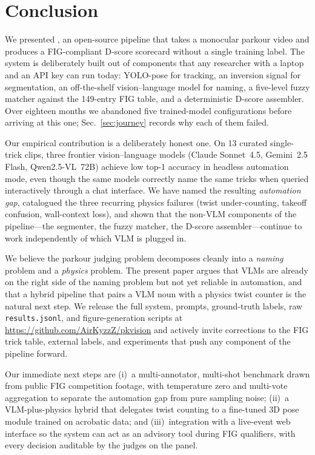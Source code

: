 \section{Conclusion}
\label{sec:conclusion}

We presented \sys{}, an open-source pipeline that takes a monocular
parkour video and produces a FIG-compliant D-score scorecard
without a single training label. The system is deliberately built
out of components that any researcher with a laptop and an API key
can run today: YOLO-pose for tracking, an inversion signal for
segmentation, an off-the-shelf vision--language model for naming,
a five-level fuzzy matcher against the 149-entry FIG table, and a
deterministic D-score assembler. Over eighteen months we
abandoned five trained-model configurations before arriving at
this one; Sec.~\ref{sec:journey} records why each of them failed.

Our empirical contribution is a deliberately honest one. On 13
curated single-trick clips, three frontier vision--language models
(Claude Sonnet~4.5, Gemini~2.5 Flash, Qwen2.5-VL~72B) achieve low
top-1 accuracy in headless automation mode, even though the same
models correctly name the same tricks when queried interactively
through a chat interface. We have named the resulting
\emph{automation gap}, catalogued the three recurring physics
failures (twist under-counting, takeoff confusion, wall-context
loss), and shown that the non-VLM components of the pipeline---the
segmenter, the fuzzy matcher, the D-score assembler---continue to
work independently of which VLM is plugged in.

We believe the parkour judging problem decomposes cleanly into a
\emph{naming} problem and a \emph{physics} problem. The present
paper argues that VLMs are already on the right side of the naming
problem but not yet reliable in automation, and that a hybrid
pipeline that pairs a VLM noun with a physics twist counter is the
natural next step. We release the full system, prompts, ground-truth
labels, raw \texttt{results.jsonl}, and figure-generation scripts at
\url{https://github.com/AirKyzzZ/pkvision} and actively invite
corrections to the FIG trick table, external labels, and experiments
that push any component of the pipeline forward.

Our immediate next steps are (i)~a multi-annotator, multi-shot
benchmark drawn from public FIG competition footage, with temperature
zero and multi-vote aggregation to separate the automation gap from
pure sampling noise; (ii)~a VLM-plus-physics hybrid that delegates
twist counting to a fine-tuned 3D pose module trained on acrobatic
data; and (iii)~integration with a live-event web interface so the
system can act as an advisory tool during FIG qualifiers, with every
decision auditable by the judges on the panel.
